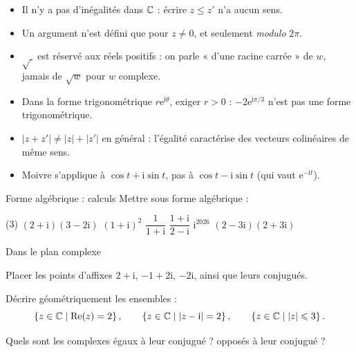 \begin{attention}
\begin{itemize}[label={\color{otOrange}\textbullet},leftmargin=1.4em,itemsep=0.6mm,topsep=0.5mm]
  \item Il n'y a pas d'inégalités dans $\mathbb{C}$ : écrire $z\leq z'$ n'a aucun sens.
  \item Un argument n'est défini que pour $z\neq0$, et seulement \emph{modulo} $2\pi$.
  \item $\sqrt{\ }$ est réservé aux réels positifs : on parle « d'une racine
    carrée » de $w$, jamais de $\sqrt{w}$ pour $w$ complexe.
  \item Dans la forme trigonométrique $r\mathrm{e}^{\mathrm{i}\theta}$, exiger $r>0$ :
    $-2\mathrm{e}^{\mathrm{i}\pi/3}$ n'est pas une forme trigonométrique.
  \item $|z+z'|\neq|z|+|z'|$ en général : l'égalité caractérise des vecteurs colinéaires de même sens.
  \item Moivre s'applique à $\cos t+\mathrm{i}\sin t$, pas à $\cos t-\mathrm{i}\sin t$
    (qui vaut $\mathrm{e}^{-\mathrm{i}t}$).
\end{itemize}
\end{attention}

\exercices
{}

\begin{exercice}[1]{Forme algébrique : calculs}
Mettre sous forme algébrique :
\begin{tasks}(3)
  \task $(2+\mathrm{i})(3-2\mathrm{i})$
  \task $(1+\mathrm{i})^{2}$
  \task $\dfrac{1}{1+\mathrm{i}}$
  \task $\dfrac{1+\mathrm{i}}{2-\mathrm{i}}$
  \task $\mathrm{i}^{2026}$
  \task $(2-3\mathrm{i})(2+3\mathrm{i})$
\end{tasks}
\end{exercice}

\begin{exercice}[1]{Dans le plan complexe}
\begin{questions}
  \item Placer les points d'affixes $2+\mathrm{i}$, $-1+2\mathrm{i}$,
    $-2\mathrm{i}$, ainsi que leurs conjugués.
  \item Décrire géométriquement les ensembles :
    \[
      \left\{z\in\mathbb{C} \mid \operatorname{Re}(z)=2\right\},\qquad
      \left\{z\in\mathbb{C} \mid |z-\mathrm{i}|=2\right\},\qquad
      \left\{z\in\mathbb{C} \mid |z|\leqslant3\right\}.
    \]
  \item Quels sont les complexes égaux à leur conjugué ? opposés à leur
    conjugué ?
\end{questions}
\end{exercice}

